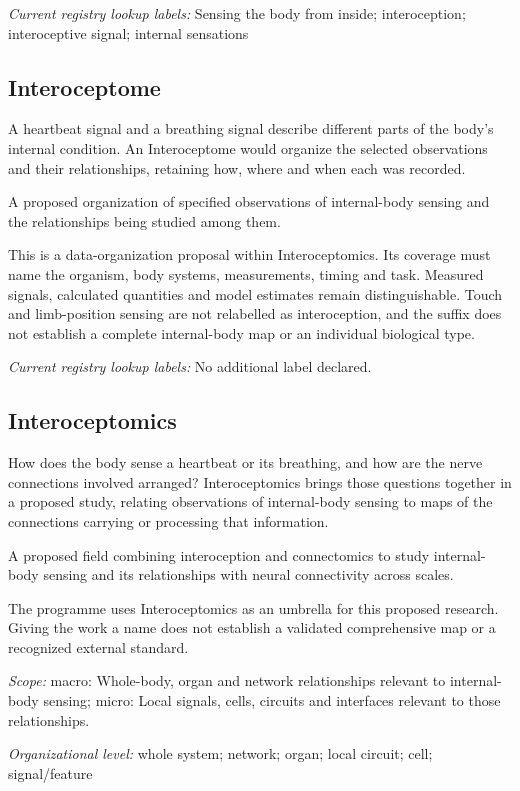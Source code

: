 \noindent\textit{Current registry lookup labels:} Sensing the body from inside; interoception; interoceptive signal; internal sensations\par

\subsection*{Interoceptome}
\noindent A heartbeat signal and a breathing signal describe different parts of the body’s internal condition. An Interoceptome would organize the selected observations and their relationships, retaining how, where and when each was recorded.\par
\noindent A proposed organization of specified observations of internal-body sensing and the relationships being studied among them.\par
\noindent This is a data-organization proposal within Interoceptomics. Its coverage must name the organism, body systems, measurements, timing and task. Measured signals, calculated quantities and model estimates remain distinguishable. Touch and limb-position sensing are not relabelled as interoception, and the suffix does not establish a complete internal-body map or an individual biological type.\par


\noindent\textit{Current registry lookup labels:} No additional label declared.\par

\begin{samepage}
\subsection*{Interoceptomics}
\noindent How does the body sense a heartbeat or its breathing, and how are the nerve connections involved arranged? Interoceptomics brings those questions together in a proposed study, relating observations of internal-body sensing to maps of the connections carrying or processing that information.\par
\end{samepage}
\noindent A proposed field combining interoception and connectomics to study internal-body sensing and its relationships with neural connectivity across scales.\par
\noindent The programme uses Interoceptomics as an umbrella for this proposed research. Giving the work a name does not establish a validated comprehensive map or a recognized external standard.\par
\noindent\textit{Scope:} macro: Whole-body, organ and network relationships relevant to internal-body sensing; micro: Local signals, cells, circuits and interfaces relevant to those relationships.\par
\begin{samepage}
\noindent\textit{Organizational level:} whole system; network; organ; local circuit; cell; signal/feature\par\nopagebreak[4]
\nopagebreak[4]
\end{samepage}


